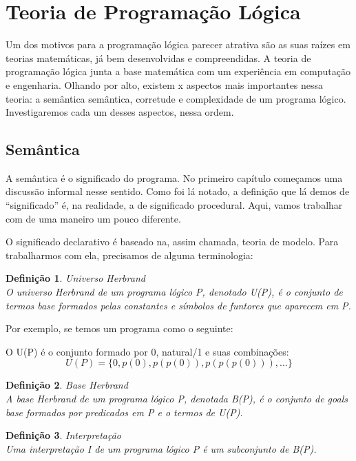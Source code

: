 \documentclass{article}
\newtheorem{definition}{Definição}[section]
\theoremstyle{remark}
\begin{document}
\section{Teoria de Programação Lógica}

Um dos motivos para a programação lógica parecer atrativa são as suas raízes em teorias matemáticas, já bem desenvolvidas e compreendidas. A teoria de programação lógica junta a base matemática com um experiência em computação e engenharia. Olhando por alto, existem x aspectos mais importantes nessa teoria: a semântica semântica, corretude e complexidade de um programa lógico. Investigaremos cada um desses aspectos, nessa ordem.

\subsection{Semântica}
A semântica é o significado do programa. No primeiro capítulo começamos uma discussão informal nesse sentido. Como foi lá notado, a definição que lá demos de ``significado'' é, na realidade, a de significado procedural. Aqui, vamos trabalhar com de uma maneiro um pouco diferente.

O significado declarativo é baseado na, assim chamada, teoria de modelo. Para trabalharmos com ela, precisamos de alguma terminologia:

\begin{definition}{Universo Herbrand}
  \\O universo Herbrand de um programa lógico P, denotado U(P), é o conjunto de termos base formados pelas constantes e símbolos de funtores que aparecem em P.
\end{definition}

Por exemplo, se temos um programa como o seguinte:



O U(P) é o conjunto formado por 0, natural/1 e suas combinações:
\[
  U(P) = \{0, p(0), p(p(0)), p(p(p(0))), ...\}
\]

\begin{definition}{Base Herbrand}
  \\ A base Herbrand de um programa lógico P, denotada B(P), é o conjunto de goals base formados por predicados em P e o termos de U(P).
\end{definition}

\begin{definition}{Interpretação}
  \\ Uma interpretação I de um programa lógico P é um subconjunto de B(P).
\end{definition}
\end{document}

